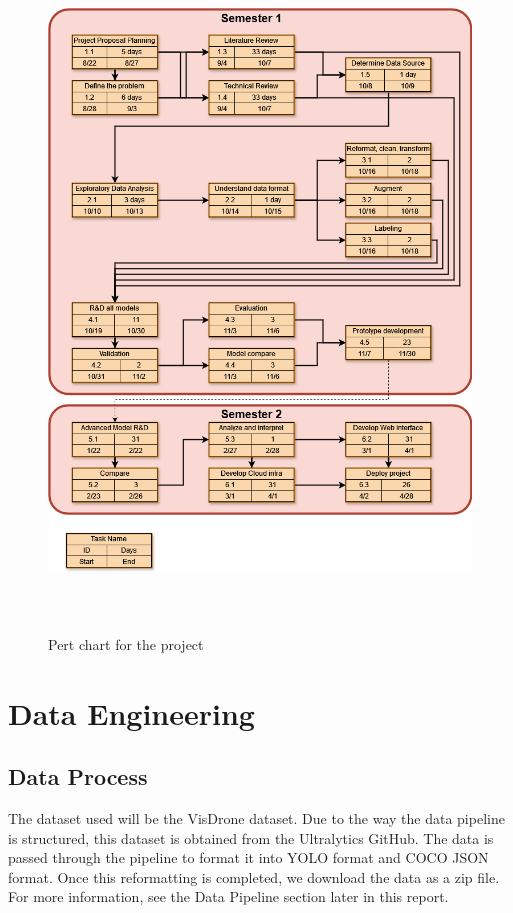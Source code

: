\documentclass[stu,12pt,floatsintext]{apa7}
\begin{document}
\begin{figure}[!htb]
    \centering
    \includegraphics[height=18cm]{images/pert.png}
    \caption{Pert chart for the project}
    \label{fig:pert}
\end{figure}

\newpage
\clearpage
\section{Data Engineering}
\subsection{Data Process}
The dataset used will be the VisDrone dataset. Due to the way the data pipeline is structured, this dataset is obtained from the Ultralytics GitHub. The data is passed through the pipeline to format it into YOLO format and COCO JSON format. Once this reformatting is completed, we download the data as a zip file. For more information, see the Data Pipeline section later in this report.
\end{document}
